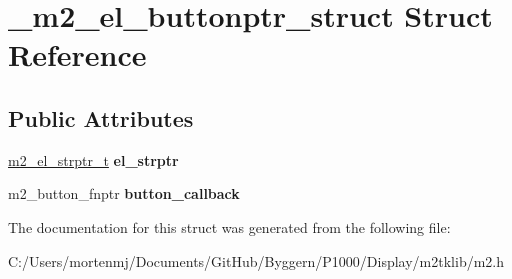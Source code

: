 \hypertarget{struct__m2__el__buttonptr__struct}{\section{\-\_\-m2\-\_\-el\-\_\-buttonptr\-\_\-struct Struct Reference}
\label{struct__m2__el__buttonptr__struct}
}
\subsection*{Public Attributes}
\begin{DoxyCompactItemize}
\item 
\hypertarget{struct__m2__el__buttonptr__struct_a2edfb65874cc8036b2192e207fa03869}{\hyperlink{struct__m2__el__strptr__struct}{m2\-\_\-el\-\_\-strptr\-\_\-t} {\bfseries el\-\_\-strptr}}\label{struct__m2__el__buttonptr__struct_a2edfb65874cc8036b2192e207fa03869}

\item 
\hypertarget{struct__m2__el__buttonptr__struct_a460c76e7d318eb110264d3d3c75ed239}{m2\-\_\-button\-\_\-fnptr {\bfseries button\-\_\-callback}}\label{struct__m2__el__buttonptr__struct_a460c76e7d318eb110264d3d3c75ed239}

\end{DoxyCompactItemize}


The documentation for this struct was generated from the following file\-:\begin{DoxyCompactItemize}
\item 
C\-:/\-Users/mortenmj/\-Documents/\-Git\-Hub/\-Byggern/\-P1000/\-Display/m2tklib/m2.\-h\end{DoxyCompactItemize}
